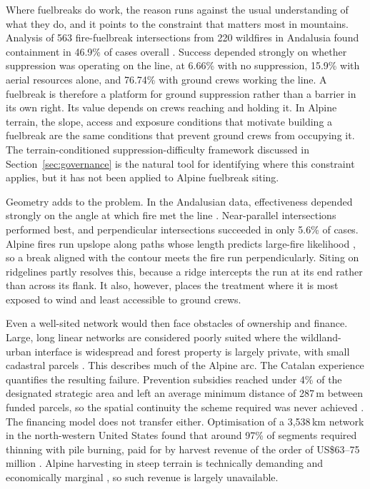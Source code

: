 \documentclass[11pt,a4paper]{article}
\begin{document}
Where fuelbreaks do work, the reason runs against the usual understanding of what they do, and it points to the constraint that matters most in mountains. Analysis of 563 fire-fuelbreak intersections from 220 wildfires in Andalusia found containment in 46.9\% of cases overall \citep{ortega_modeling_2024}. Success depended strongly on whether suppression was operating on the line, at 6.66\% with no suppression, 15.9\% with aerial resources alone, and 76.74\% with ground crews working the line. A fuelbreak is therefore a platform for ground suppression rather than a barrier in its own right. Its value depends on crews reaching and holding it. In Alpine terrain, the slope, access and exposure conditions that motivate building a fuelbreak are the same conditions that prevent ground crews from occupying it. The terrain-conditioned suppression-difficulty framework discussed in Section~\ref{sec:governance} is the natural tool for identifying where this constraint applies, but it has not been applied to Alpine fuelbreak siting.

Geometry adds to the problem. In the Andalusian data, effectiveness depended strongly on the angle at which fire met the line \citep{ortega_modeling_2024}. Near-parallel intersections performed best, and perpendicular intersections succeeded in only 5.6\% of cases. Alpine fires run upslope along paths whose length predicts large-fire likelihood \citep{conedera_linking_2024}, so a break aligned with the contour meets the fire run perpendicularly. Siting on ridgelines \citep{ascoli_firebreak_2018} partly resolves this, because a ridge intercepts the run at its end rather than across its flank. It also, however, places the treatment where it is most exposed to wind and least accessible to ground crews.

Even a well-sited network would then face obstacles of ownership and finance. Large, long linear networks are considered poorly suited where the wildland-urban interface is widespread and forest property is largely private, with small cadastral parcels \citep{ascoli_firebreak_2018}. This describes much of the Alpine arc. The Catalan experience quantifies the resulting failure. Prevention subsidies reached under 4\% of the designated strategic area and left an average minimum distance of 287\,m between funded parcels, so the spatial continuity the scheme required was never achieved \citep{gorrizmifsud_current_2026}. The financing model does not transfer either. Optimisation of a 3{,}538\,km network in the north-western United States found that around 97\% of segments required thinning with pile burning, paid for by harvest revenue of the order of US\$63--75 million \citep{ager_optimizing_2023}. Alpine harvesting in steep terrain is technically demanding and economically marginal \citep{dinca_timber_2025}, so such revenue is largely unavailable.
\end{document}
